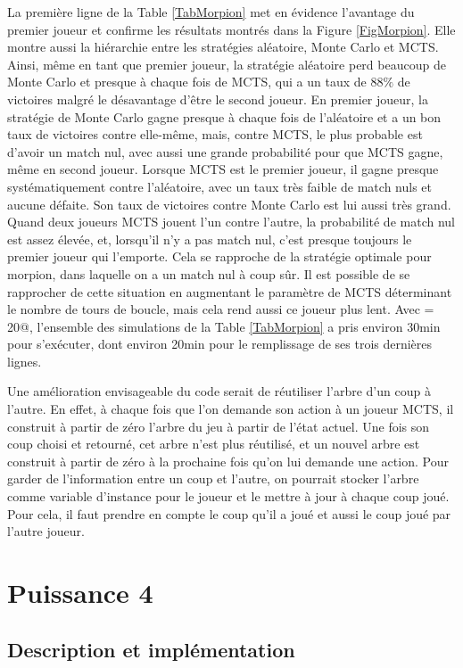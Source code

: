 \documentclass[a4paper,11pt]{article}
\begin{document}
La première ligne de la Table \ref{TabMorpion} met en évidence l'avantage du premier joueur et confirme les résultats montrés dans la Figure \ref{FigMorpion}. Elle montre aussi la hiérarchie entre les stratégies aléatoire, Monte Carlo et MCTS. Ainsi, même en tant que premier joueur, la stratégie aléatoire perd beaucoup de Monte Carlo et presque à chaque fois de MCTS, qui a un taux de $88\%$ de victoires malgré le désavantage d'être le second joueur. En premier joueur, la stratégie de Monte Carlo gagne presque à chaque fois de l'aléatoire et a un bon taux de victoires contre elle-même, mais, contre MCTS, le plus probable est d'avoir un match nul, avec aussi une grande probabilité pour que MCTS gagne, même en second joueur. Lorsque MCTS est le premier joueur, il gagne presque systématiquement contre l'aléatoire, avec un taux très faible de match nuls et aucune défaite. Son taux de victoires contre Monte Carlo est lui aussi très grand. Quand deux joueurs MCTS jouent l'un contre l'autre, la probabilité de match nul est assez élevée, et, lorsqu'il n'y a pas match nul, c'est presque toujours le premier joueur qui l'emporte. Cela se rapproche de la stratégie optimale pour morpion, dans laquelle on a un match nul à coup sûr. Il est possible de se rapprocher de cette situation en augmentant le paramètre \verb@n@ de MCTS déterminant le nombre de tours de boucle, mais cela rend aussi ce joueur plus lent. Avec \verb@n = 20@, l'ensemble des simulations de la Table \ref{TabMorpion} a pris environ 30min pour s'exécuter, dont environ 20min pour le remplissage de ses trois dernières lignes.

Une amélioration envisageable du code serait de réutiliser l'arbre d'un coup à l'autre. En effet, à chaque fois que l'on demande son action à un joueur MCTS, il construit à partir de zéro l'arbre du jeu à partir de l'état actuel. Une fois son coup choisi et retourné, cet arbre n'est plus réutilisé, et un nouvel arbre est construit à partir de zéro à la prochaine fois qu'on lui demande une action. Pour garder de l'information entre un coup et l'autre, on pourrait stocker l'arbre comme variable d'instance pour le joueur et le mettre à jour à chaque coup joué. Pour cela, il faut prendre en compte le coup qu'il a joué et aussi le coup joué par l'autre joueur.

\section{Puissance 4}
\label{SecPuissance4}

\subsection{Description et implémentation}
\end{document}
